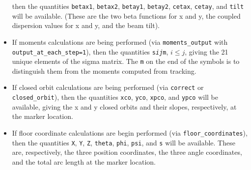 \begin{itemize}
  then the quantities  \verb|betax1|, \verb|betax2|, \verb|betay1|, \verb|betay2|, \verb|cetax|, \verb|cetay|, and \verb|tilt| will be available.
  (These are the two beta functions for x and y, the coupled dispersion values for x and y, and the beam tilt).
\item If moments calculations are being performed (via {\tt moments\_output} with  {\tt output\_at\_each\_step=1}), then the quantities 
 {\tt s{\em i}{\em j}m}, $i\leq j$, giving the 21 unique elements of the sigma matrix.   The
 {\tt m} on the end of the symbols is to distinguish them from the moments computed from tracking.
\item If closed orbit calculations are being performed (via {\tt correct} or {\tt closed\_orbit}), then
  the quantities {\tt xco}, {\tt yco}, {\tt xpco}, and {\tt ypco} will be available, giving the
  x and y closed orbits and their slopes, respectively, at the marker location.
\item If floor coordinate calculations are begin performed (via {\tt floor\_coordinates}), then the quantities
  {\tt X}, {\tt Y}, {\tt Z}, {\tt theta}, {\tt phi}, {\tt psi}, and {\tt s} will be available.  These are,
  respectively, the three position coordinates, the three angle coordinates, and the total arc length
  at the marker location.
\end{itemize}
